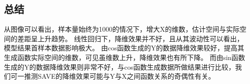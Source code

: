 \subsection{总结}
从图像可以看出，样本量始终为1000的情况下，增大X的维数，估计空间与实际空间的差距呈上升趋势。
线性回归下，降维效果并不好，且从其波动性可以看出，模型结果首样本数据影响极大。
由cos函数生成的Y的数据降维效果较好，提高其生成函数实际空间的维数，可见虽维数上升，降维效果也有所下降。
而由sin函数生成的Y的数据降维效果则非常不好，与cos函数生成数据所做结果进行比较，我们可一推测SAVE的降维效果可能与Y与X之间函数关系的奇偶性有关。
